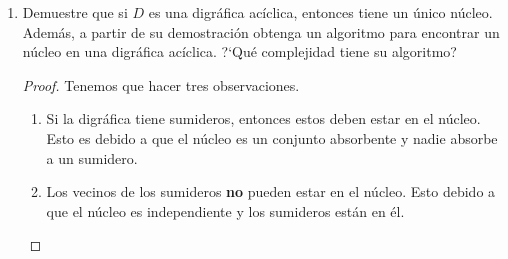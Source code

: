 \documentclass{article}
\begin{document}
\begin{enumerate}
\begin{proof}
      \begin{itemize}
      \item Dentro de $C_u$, sigue la trayectoria desde $u$
        hasta el vértice que sale a la siguiente componente en el
        ciclo (dicha trayectoria existe porque $C_u$ es
        fuertemente conexa).
      \item De ahí, se va a la siguiente componente y al ser
        esta a su vez fuertemente conexa, puede también tomar una
        trayectoria que salga de ella y se dirija a la siguiente
        componente del ciclo.
      \item Hace esto hasta llegar a $C_v$.
      \item Una vez en $C_v$, tomamos la trayectoria hasta $v$,
        que existe por ser $C_v$ fuertemente conexa.
      \end{itemize}

      Por lo tanto, hay una trayectoria de $u$ a $v$. De manera
      análoga, hay una trayectoria de $v$ a $u$. Como $u$ y $v$
      eran vértices arbitrarios, entonces $D'$ es fuertememente
      conexa. Pero esto es una contradicción, ya que $D'$
      contiene a $C_1$, que es una componente fuertemenete
      conexa, lo que signficia que es maximal por contención.

      Por lo tanto, no puede haber un ciclo en $D^\ast$.
      
      
    \end{proof}
    
  \item Demuestre que si $D$ es una digr\'afica ac\'iclica, entonces
    tiene un \'unico n\'ucleo.   Adem\'as, a partir de su demostraci\'on
    obtenga un algoritmo para encontrar un n\'ucleo en una digr\'afica
    ac\'iclica.   ?`Qu\'e complejidad tiene su algoritmo?
    
    \begin{proof}
      
      Tenemos que hacer tres observaciones.
      
      \begin{enumerate}
      \item \label{itm:kernel} Si la digr\'afica tiene sumideros, entonces estos
        deben estar en el n\'ucleo. Esto es debido a que el n\'ucleo es un
        conjunto absorbente y nadie absorbe a un sumidero.
        
      \item \label{itm:neighbors} Los vecinos de los sumideros \textbf{no} pueden estar en el
        n\'ucleo. Esto debido a que el n\'ucleo es independiente y los sumideros
        est\'an en \'el.      
        

\end{enumerate}
\end{proof}
\end{enumerate}
\end{document}
